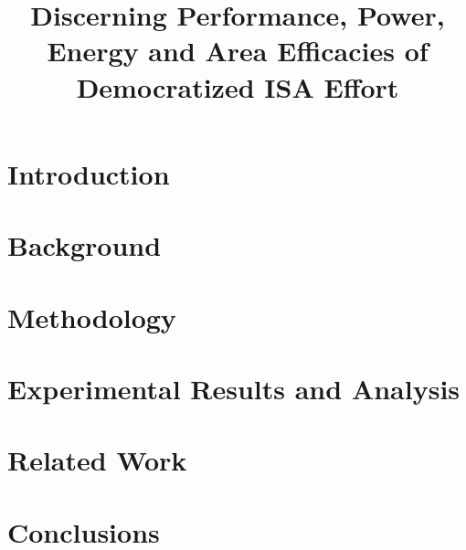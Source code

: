\documentclass{sig-alternate}
\title{Discerning Performance, Power, Energy and Area Efficacies of Democratized ISA Effort}
\begin{document}
\maketitle
\thispagestyle{firstpage}
\pagestyle{plain}




\begin{abstract}

  

\end{abstract}

\section{Introduction}


\section{Background}


\section{Methodology}


\section{Experimental Results and Analysis}


\section{Related Work}
%

\section{Conclusions}


\end{document}

